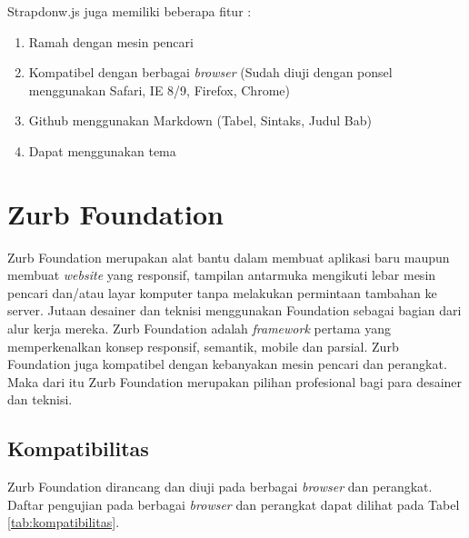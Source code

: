 Strapdonw.js juga memiliki beberapa fitur :
\begin{enumerate}[(1)]
\item Ramah dengan mesin pencari
\item Kompatibel dengan berbagai {\it browser} (Sudah diuji dengan ponsel menggunakan
Safari, IE 8/9, Firefox, Chrome)
\item Github menggunakan Markdown (Tabel, Sintaks, Judul Bab)
\item Dapat menggunakan tema
\end{enumerate}

\section{Zurb Foundation \cite{Zurb:2015}}
\label{sec:zurbfoundation}

Zurb Foundation merupakan alat bantu dalam membuat aplikasi baru maupun membuat {\it website} yang responsif, tampilan antarmuka mengikuti lebar mesin pencari dan/atau layar komputer tanpa melakukan permintaan tambahan ke server. Jutaan desainer dan teknisi menggunakan Foundation sebagai bagian dari alur kerja mereka. Zurb Foundation adalah {\it framework} pertama yang memperkenalkan konsep responsif, semantik, mobile dan parsial. Zurb Foundation juga kompatibel dengan kebanyakan mesin pencari dan perangkat. Maka dari itu Zurb Foundation merupakan pilihan profesional bagi para desainer dan teknisi.

\subsection{Kompatibilitas}
Zurb Foundation dirancang dan diuji pada berbagai {\it browser} dan perangkat. Daftar pengujian pada berbagai {\it browser} dan perangkat dapat dilihat pada Tabel \ref{tab:kompatibilitas}.

